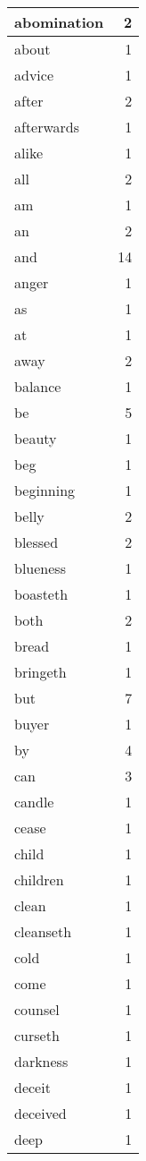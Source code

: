 \begin{center}
\begin{longtable}{l|r}
abomination & 2\\ \hline 
about & 1\\ \hline 
advice & 1\\ \hline 
after & 2\\ \hline 
afterwards & 1\\ \hline 
alike & 1\\ \hline 
all & 2\\ \hline 
am & 1\\ \hline 
an & 2\\ \hline 
and & 14\\ \hline 
anger & 1\\ \hline 
as & 1\\ \hline 
at & 1\\ \hline 
away & 2\\ \hline 
balance & 1\\ \hline 
be & 5\\ \hline 
beauty & 1\\ \hline 
beg & 1\\ \hline 
beginning & 1\\ \hline 
belly & 2\\ \hline 
blessed & 2\\ \hline 
blueness & 1\\ \hline 
boasteth & 1\\ \hline 
both & 2\\ \hline 
bread & 1\\ \hline 
bringeth & 1\\ \hline 
but & 7\\ \hline 
buyer & 1\\ \hline 
by & 4\\ \hline 
can & 3\\ \hline 
candle & 1\\ \hline 
cease & 1\\ \hline 
child & 1\\ \hline 
children & 1\\ \hline 
clean & 1\\ \hline 
cleanseth & 1\\ \hline 
cold & 1\\ \hline 
come & 1\\ \hline 
counsel & 1\\ \hline 
curseth & 1\\ \hline 
darkness & 1\\ \hline 
deceit & 1\\ \hline 
deceived & 1\\ \hline 
deep & 1\\ \hline 

\end{longtable}
\end{center}
